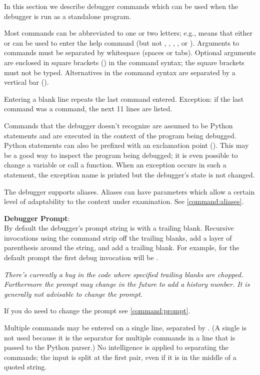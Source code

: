 In this section we describe debugger commands which can be used when
the debugger is run as a standalone program.

Most commands can be abbreviated to one or two letters;
e.g.,  means that either  or  can be
used to enter the help command (but not , ,
, , or ).  Arguments to commands must
be separated by whitespace (spaces or tabs).  Optional arguments are
enclosed in square brackets (\samp{[]}) in the command syntax; the
square brackets must not be typed.  Alternatives in the command syntax
are separated by a vertical bar (\samp{|}).

Entering a blank line repeats the last command entered.  Exception: if
the last command was a  command, the next 11 lines are
listed.

Commands that the debugger doesn't recognize are assumed to be Python
statements and are executed in the context of the program being
debugged.  Python statements can also be prefixed with an exclamation
point (\samp{!}).  This may be a good way to inspect the program being
debugged; it is even possible to change a variable or call a function.
When an exception occurs in such a statement, the exception name is
printed but the debugger's state is not changed.

The debugger supports aliases.  Aliases can have parameters which
allow a certain level of adaptability to the context under
examination. See \ref{command:aliases}.

{\bf Debugger Prompt}:\label{debugger:prompt}\\
By default the debugger's prompt string is  with 
a trailing blank. Recursive invocations using the
 command strip off the trailing blanks, add a layer of
parenthesis around the string, and add a trailing blank. For example,
for the default prompt the first debug invocation will be
.

\emph{There's currently a bug in the code where specified trailing
blanks are chopped. Furthermore the prompt may change in the future to
add a history number. It is generally not advisable to change the
prompt.}

If you do need to change the prompt see
\ref{command:prompt}.


Multiple commands may be entered on a single line, separated by
\samp{;;}.  (A single \samp{;} is not used because it is
the separator for multiple commands in a line that is passed to
the Python parser.)
No intelligence is applied to separating the commands;
the input is split at the first \samp{;;} pair, even if it is in
the middle of a quoted string.

